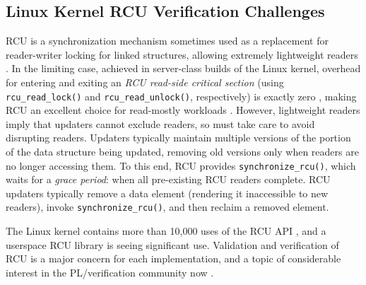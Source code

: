 \documentclass[conference]{IEEEtran}
\begin{document}
\subsection{Linux Kernel RCU Verification Challenges}



RCU is a synchronization mechanism sometimes used as a replacement
for reader-writer locking for linked structures, allowing extremely
lightweight readers \cite{McKenney:2013:SDS:2483852.2483867}.
In the limiting case, achieved in server-class builds of the
Linux kernel, overhead for entering and exiting an \emph{RCU read-side
critical section} (using {\tt rcu\_read\_lock()} and {\tt rcu\_read\_unlock()},
respectively) is exactly zero \cite{McKenney98}, making RCU an
excellent choice for read-mostly workloads \cite{McKenney:2013:SDS:2483852.2483867,DinakarGuniguntala2008IBMSysJ,PaulMcKenney2013AMPenergyHOTPAR}.
However, lightweight readers imply that updaters cannot exclude readers,
so must take care to avoid disrupting readers.
Updaters typically maintain multiple versions of the portion of the
data structure being updated, removing old versions only when
readers are no longer accessing them.
To this end, RCU provides {\tt synchronize\_rcu()}, which waits for a
\emph{grace period}: when all pre-existing RCU readers complete.
RCU updaters typically remove a data element (rendering it
inaccessible to new readers), invoke {\tt synchronize\_rcu()},
and then reclaim a removed element.

The Linux kernel contains more than 10,000 uses of the RCU
API \cite{PaulEMcKenneyRCUusagePage}, and a userspace RCU
library \cite{MathieuDesnoyers2009URCU,MathieuDesnoyers2012URCU}
is seeing significant use.  Validation and verification of RCU is a
major concern for each implementation, and a topic of considerable
interest in the PL/verification community now \cite{PLDI15RCU}.

\end{document}
